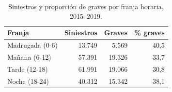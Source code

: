 \begin{table}[h]\centering\small
\caption{Siniestros y proporción de graves por franja horaria, 2015--2019.}\label{tab:franja}
\begin{tabular}{lrrr}
\toprule
Franja & Siniestros & Graves & \% graves \\
\midrule
Madrugada (0-6) & 13.749 & 5.569 & 40,5 \\
Mañana (6-12) & 57.391 & 19.326 & 33,7 \\
Tarde (12-18) & 61.991 & 19.066 & 30,8 \\
Noche (18-24) & 40.312 & 15.342 & 38,1 \\
\bottomrule
\end{tabular}
\end{table}